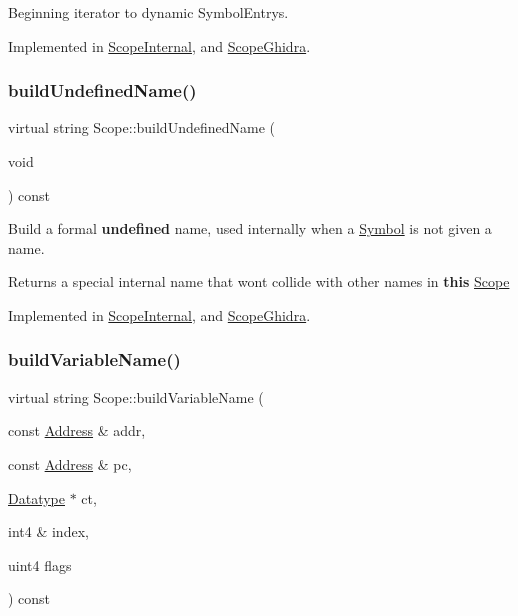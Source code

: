 Beginning iterator to dynamic Symbol\+Entrys. 



Implemented in \mbox{\hyperlink{class_scope_internal_afc5849bd91bd3eb1aa65900888317f98}{Scope\+Internal}}, and \mbox{\hyperlink{class_scope_ghidra_a9c510456a060e6bbfb503f7e861afd2e}{Scope\+Ghidra}}.

\mbox{\label{class_scope_ac47d5c1c949be84a27a138be0febacb2}} 
\subsubsection{\texorpdfstring{buildUndefinedName()}{buildUndefinedName()}}
{\footnotesize\ttfamily virtual string Scope\+::build\+Undefined\+Name (\begin{DoxyParamCaption}\item[{void}]{ }\end{DoxyParamCaption}) const\hspace{0.3cm}{\ttfamily [pure virtual]}}



Build a formal {\bfseries{undefined}} name, used internally when a \mbox{\hyperlink{class_symbol}{Symbol}} is not given a name. 

\begin{DoxyReturn}{Returns}
a special internal name that won\textquotesingle{}t collide with other names in {\bfseries{this}} \mbox{\hyperlink{class_scope}{Scope}} 
\end{DoxyReturn}


Implemented in \mbox{\hyperlink{class_scope_internal_a17225ae39210e0dbf1efb1a3ee847d72}{Scope\+Internal}}, and \mbox{\hyperlink{class_scope_ghidra_a25f55a3495b08a4caafaaeb5c1cf8bed}{Scope\+Ghidra}}.

\mbox{\label{class_scope_a925baecb33b6f0d9212e42c1b48a64ba}} 
\subsubsection{\texorpdfstring{buildVariableName()}{buildVariableName()}}
{\footnotesize\ttfamily virtual string Scope\+::build\+Variable\+Name (\begin{DoxyParamCaption}\item[{const \mbox{\hyperlink{class_address}{Address}} \&}]{addr,  }\item[{const \mbox{\hyperlink{class_address}{Address}} \&}]{pc,  }\item[{\mbox{\hyperlink{class_datatype}{Datatype}} $\ast$}]{ct,  }\item[{int4 \&}]{index,  }\item[{uint4}]{flags }\end{DoxyParamCaption}) const\hspace{0.3cm}{\ttfamily [pure virtual]}}



